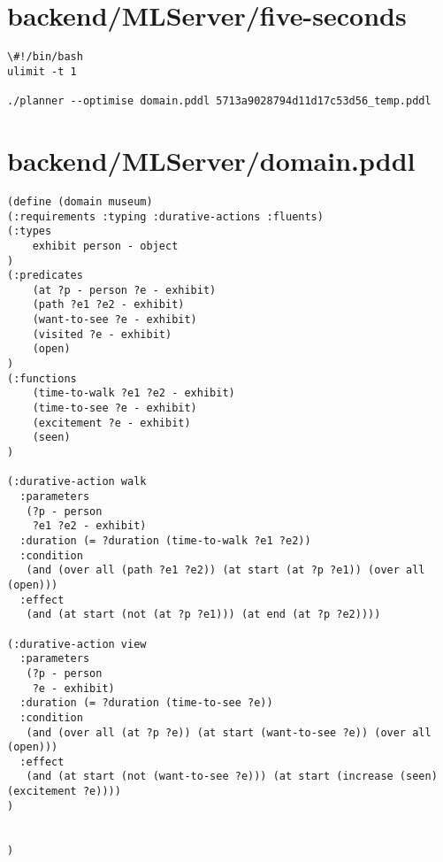 \section{backend/MLServer/five-seconds}
\begin{lstlisting}\#!/bin/bash
ulimit -t 1

./planner --optimise domain.pddl 5713a9028794d11d17c53d56_temp.pddl
\end{lstlisting}
\newpage
\section{backend/MLServer/domain.pddl}
\begin{lstlisting}(define (domain museum)
(:requirements :typing :durative-actions :fluents)
(:types
    exhibit person - object
)
(:predicates
    (at ?p - person ?e - exhibit)
    (path ?e1 ?e2 - exhibit)
    (want-to-see ?e - exhibit)
    (visited ?e - exhibit)
    (open)
)
(:functions
    (time-to-walk ?e1 ?e2 - exhibit)
    (time-to-see ?e - exhibit)
    (excitement ?e - exhibit)
    (seen)
)

(:durative-action walk
  :parameters
   (?p - person
    ?e1 ?e2 - exhibit)
  :duration (= ?duration (time-to-walk ?e1 ?e2))
  :condition
   (and (over all (path ?e1 ?e2)) (at start (at ?p ?e1)) (over all (open)))
  :effect
   (and (at start (not (at ?p ?e1))) (at end (at ?p ?e2))))

(:durative-action view
  :parameters
   (?p - person
    ?e - exhibit)
  :duration (= ?duration (time-to-see ?e))
  :condition
   (and (over all (at ?p ?e)) (at start (want-to-see ?e)) (over all (open)))
  :effect
   (and (at start (not (want-to-see ?e))) (at start (increase (seen) (excitement ?e))))
)


)
\end{lstlisting}
\newpage
